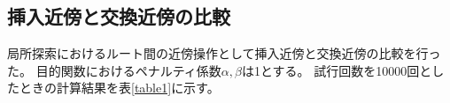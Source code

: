 \subsection{挿入近傍と交換近傍の比較}
局所探索におけるルート間の近傍操作として挿入近傍と交換近傍の比較を行った。
目的関数におけるペナルティ係数$\alpha,\beta$は1とする。
試行回数を10000回としたときの計算結果を表\ref{table1}に示す。





